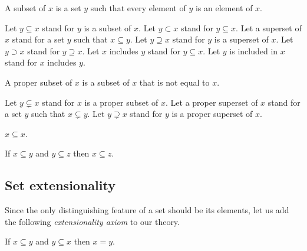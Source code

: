 \documentclass[../../set-theory.ftl.tex]{subfiles}
\begin{document}
  \begin{forthel}
    \begin{definition}
      A subset of $x$ is a set $y$ such that every element of $y$ is an element of $x$.
    \end{definition}

    Let $y \subseteq x$ stand for $y$ is a subset of $x$.
    Let $y \subset x$ stand for $y \subseteq x$.
    Let a superset of $x$ stand for a set $y$ such that $x \subseteq y$.
    Let $y \supseteq x$ stand for $y$ is a superset of $x$.
    Let $y \supset x$ stand for $y \supseteq x$.
    Let $x$ includes $y$ stand for $y \subseteq x$.
    Let $y$ is included in $x$ stand for $x$ includes $y$.

    \begin{definition}
      A proper subset of $x$ is a subset of $x$ that is not equal to $x$.
    \end{definition}

    Let $y \subsetneq x$ stand for $x$ is a proper subset of $x$.
    Let a proper superset of $x$ stand for a set $y$ such that $x \subsetneq y$.
    Let $y \supsetneq x$ stand for $y$ is a proper superset of $x$.

    \begin{proposition}\label{SetTheory_01_01_375611}
      $x \subseteq x$.
    \end{proposition}

    \begin{proposition}\label{SetTheory_01_01_726162}
      If $x \subseteq y$ and $y \subseteq z$ then $x \subseteq z$.
    \end{proposition}
  \end{forthel}


  \subsection{Set extensionality}

  \noindent Since the only distinguishing feature of a set should be its
  elements, let us add the following \textit{extensionality axiom} to our
  theory.

  \begin{forthel}
    \begin{axiom}\label{SetTheory_01_01_253735}
      If $x \subseteq y$ and $y \subseteq x$ then $x = y$.
    \end{axiom}
  \end{forthel}
\end{document}
